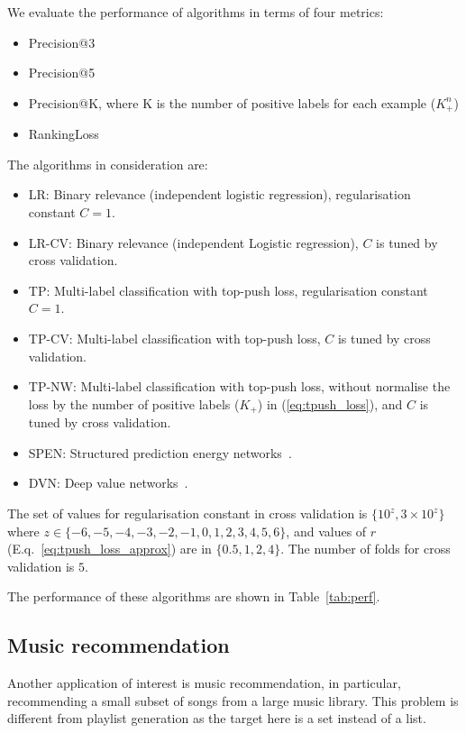 \noindent
We evaluate the performance of algorithms in terms of four metrics:
\begin{itemize}
\item Precision@3
\item Precision@5
\item Precision@K, where K is the number of positive labels for each example (\ie $K_+^n$)
\item RankingLoss
\end{itemize}

\noindent
The algorithms in consideration are:
\begin{itemize}
\item LR: Binary relevance (\ie independent logistic regression), regularisation constant $C = 1$.
\item LR-CV: Binary relevance (\ie independent Logistic regression), $C$ is tuned by cross validation.
\item TP: Multi-label classification with top-push loss, regularisation constant $C=1$.
\item TP-CV: Multi-label classification with top-push loss, $C$ is tuned by cross validation.
\item TP-NW: Multi-label classification with top-push loss, without normalise the loss by the number of positive labels (\ie $K_+$)
             in (\ref{eq:tpush_loss}), and $C$ is tuned by cross validation.
\item SPEN: Structured prediction energy networks~\cite{belanger2016structured}.
\item DVN: Deep value networks~\cite{gygli17a}.
\end{itemize}
The set of values for regularisation constant in cross validation is 
$\{ 10^{z}, 3 \times 10^{z} \}$ where $z \in \{-6, -5, -4, -3, -2, -1, 0, 1, 2, 3, 4, 5, 6\}$,
and values of $r$ (E.q.~\ref{eq:tpush_loss_approx}) are in $\{0.5, 1, 2, 4\}$.
The number of folds for cross validation is $5$.


\noindent
The performance of these algorithms are shown in Table~\ref{tab:perf}.




\subsection{Music recommendation}

Another application of interest is music recommendation, in particular, recommending a small subset of songs from a large music library.
This problem is different from playlist generation%
as the target here is a set instead of a list.

